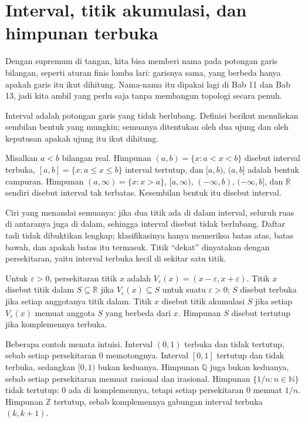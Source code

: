 \section{Interval, titik akumulasi, dan himpunan terbuka}

Dengan supremum di tangan, kita bisa memberi nama pada potongan garis bilangan, seperti
aturan finis lomba lari: garisnya sama, yang berbeda hanya apakah garis itu ikut
dihitung. Nama-nama itu dipakai lagi di Bab 11 dan Bab 13, jadi kita ambil yang perlu
saja tanpa membangun topologi secara penuh.

Interval adalah potongan garis yang tidak berlubang. Definisi berikut menuliskan
sembilan bentuk yang mungkin; semuanya ditentukan oleh dua ujung dan oleh keputusan
apakah ujung itu ikut dihitung.

\begin{definisi}[Interval]
Misalkan $a<b$ bilangan real. Himpunan $(a,b)=\{x: a<x<b\}$ disebut interval terbuka,
$[a,b]=\{x: a\le x\le b\}$ interval tertutup, dan $[a,b)$, $(a,b]$ adalah bentuk
campuran. Himpunan $(a,\infty)=\{x: x>a\}$, $[a,\infty)$, $(-\infty,b)$,
$(-\infty,b]$, dan $\mathbb{R}$ sendiri disebut interval tak terbatas. Kesembilan
bentuk itu disebut interval.
\end{definisi}

Ciri yang menandai semuanya: jika dua titik ada di dalam interval, seluruh ruas di
antaranya juga di dalam, sehingga interval disebut tidak berlubang. Daftar tadi tidak
dibuktikan lengkap; klasifikasinya hanya memeriksa batas atas, batas bawah, dan apakah
batas itu termasuk. Titik ``dekat'' dinyatakan dengan persekitaran, yaitu interval
terbuka kecil di sekitar satu titik.

\begin{definisi}
Untuk $\varepsilon>0$, persekitaran titik $x$ adalah
$V_\varepsilon(x)=(x-\varepsilon,x+\varepsilon)$. Titik $x$ disebut titik dalam
$S\subseteq\mathbb{R}$ jika $V_\varepsilon(x)\subseteq S$ untuk suatu $\varepsilon>0$;
$S$ disebut terbuka jika setiap anggotanya titik dalam. Titik $x$ disebut titik
akumulasi $S$ jika setiap $V_\varepsilon(x)$ memuat anggota $S$ yang berbeda dari $x$.
Himpunan $S$ disebut tertutup jika komplemennya terbuka.
\end{definisi}

Beberapa contoh menata intuisi. Interval $(0,1)$ terbuka dan tidak tertutup, sebab
setiap persekitaran $0$ memotongnya. Interval $[0,1]$ tertutup dan tidak terbuka,
sedangkan $[0,1)$ bukan keduanya. Himpunan $\mathbb{Q}$ juga bukan keduanya, sebab
setiap persekitaran memuat rasional dan irasional. Himpunan $\{1/n:n\in\mathbb{N}\}$
tidak tertutup: $0$ ada di komplemennya, tetapi setiap persekitaran $0$ memuat $1/n$.
Himpunan $\mathbb{Z}$ tertutup, sebab komplemennya gabungan interval terbuka $(k,k+1)$.

